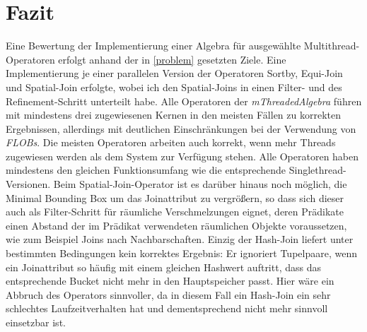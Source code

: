 \documentclass[a4paper,12pt,twoside]{article}
\newcommand{\Fb}[1]{\textit{#1}} %
\begin{document}
\section{Fazit}

Eine Bewertung der Implementierung einer Algebra für ausgewählte Multithread-Operatoren erfolgt anhand der in \autoref{problem} gesetzten Ziele. Eine Implementierung je einer parallelen Version der Operatoren Sortby, Equi-Join und Spatial-Join erfolgte, wobei ich den Spatial-Joins in einen Filter- und des Refinement-Schritt unterteilt habe. Alle Operatoren der \Fb{mThreadedAlgebra} führen mit mindestens drei zugewiesenen Kernen in den meisten Fällen zu korrekten Ergebnissen, allerdings mit deutlichen Einschränkungen bei der Verwendung von \Fb{FLOBs}. Die meisten Operatoren arbeiten auch korrekt, wenn mehr Threads zugewiesen werden als dem System zur Verfügung stehen. Alle Operatoren haben mindestens den gleichen Funktionsumfang wie die entsprechende Singlethread-Versionen. Beim Spatial-Join-Operator ist es darüber hinaus noch möglich, die Minimal Bounding Box um das Joinattribut zu vergrößern, so dass sich dieser auch als Filter-Schritt für räumliche Verschmelzungen eignet, deren Prädikate einen Abstand der im Prädikat verwendeten räumlichen Objekte voraussetzen, wie zum Beispiel Joins nach Nachbarschaften. Einzig der Hash-Join liefert unter bestimmten Bedingungen kein korrektes Ergebnis: Er ignoriert Tupelpaare, wenn ein Joinattribut so häufig mit einem gleichen Hashwert auftritt, dass das entsprechende Bucket nicht mehr in den Hauptspeicher passt. Hier wäre ein Abbruch des Operators sinnvoller, da in diesem Fall ein Hash-Join ein sehr schlechtes Laufzeitverhalten hat und dementsprechend nicht mehr sinnvoll einsetzbar ist.
\end{document}
